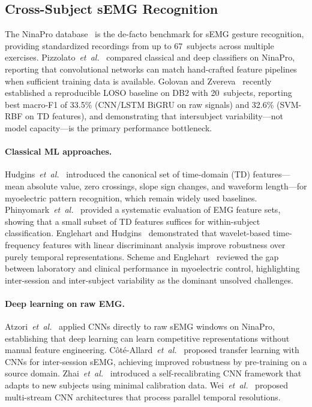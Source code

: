 \documentclass[conference]{IEEEtran}
\newcommand{\etal}{\mbox{\textit{et~al.}}}
\begin{document}
\subsection{Cross-Subject sEMG Recognition}

The NinaPro database~\cite{atzori2014electromyography} is the de-facto benchmark for sEMG gesture recognition, providing standardized recordings from up to 67~subjects across multiple exercises.
Pizzolato~\etal~\cite{pizzolato2017comparison} compared classical and deep classifiers on NinaPro, reporting that convolutional networks can match hand-crafted feature pipelines when sufficient training data is available.
Golovan and Zvereva~\cite{golovan2025benchmark} recently established a reproducible LOSO baseline on DB2 with 20~subjects, reporting best macro-F1 of 33.5\% (CNN/LSTM BiGRU on raw signals) and 32.6\% (SVM-RBF on TD features), and demonstrating that intersubject variability---not model capacity---is the primary performance bottleneck.

\paragraph{Classical ML approaches.}
Hudgins~\etal~\cite{hudgins1993new} introduced the canonical set of time-domain (TD) features---mean absolute value, zero crossings, slope sign changes, and waveform length---for myoelectric pattern recognition, which remain widely used baselines.
Phinyomark~\etal~\cite{phinyomark2012feature} provided a systematic evaluation of EMG feature sets, showing that a small subset of TD features suffices for within-subject classification.
Englehart and Hudgins~\cite{englehart2003robust} demonstrated that wavelet-based time-frequency features with linear discriminant analysis improve robustness over purely temporal representations.
Scheme and Englehart~\cite{scheme2011electromyogram} reviewed the gap between laboratory and clinical performance in myoelectric control, highlighting inter-session and inter-subject variability as the dominant unsolved challenges.

\paragraph{Deep learning on raw EMG.}
Atzori~\etal~\cite{atzori2016deep} applied CNNs directly to raw sEMG windows on NinaPro, establishing that deep learning can learn competitive representations without manual feature engineering.
C\^{o}t\'{e}-Allard~\etal~\cite{cote2019deep} proposed transfer learning with CNNs for inter-session sEMG, achieving improved robustness by pre-training on a source domain.
Zhai~\etal~\cite{zhai2017self} introduced a self-recalibrating CNN framework that adapts to new subjects using minimal calibration data.
Wei~\etal~\cite{wei2019multistream} proposed multi-stream CNN architectures that process parallel temporal resolutions.
\end{document}
